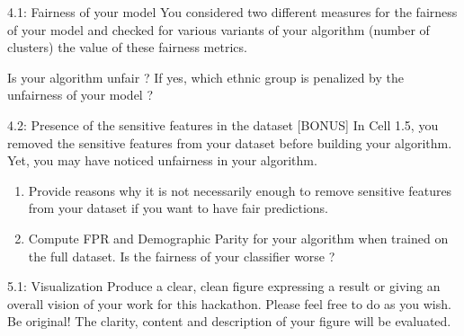 \documentclass [a4paper, 12pt] {article}
\begin{document}
\begin{question}{4.1: Fairness of your model}
You considered two different measures for the fairness of your model and checked for various variants of your algorithm (number of clusters) the value of these fairness metrics.

Is your algorithm unfair ? If yes, which ethnic group is penalized by the unfairness of your model ?
\end{question}
\begin{answer}\color{blue}
\end{answer}

\begin{question}{4.2: Presence of the sensitive features in the dataset [BONUS]}
In Cell 1.5, you removed the sensitive features from your dataset before building your algorithm. Yet, you may have noticed unfairness in your algorithm.
\begin{enumerate}
    \item Provide reasons why it is not necessarily enough to remove sensitive features from your dataset if you want to have fair predictions.
    \item Compute FPR and Demographic Parity for your algorithm when trained on the full dataset. Is the fairness of your classifier worse ?
\end{enumerate}
\end{question}
\begin{answer}\color{blue}
\end{answer}

\begin{question}{5.1: Visualization}
Produce a clear, clean figure expressing a result or giving an overall vision of your work for this hackathon. Please feel free to do as you wish. Be original! The clarity, content and description of your figure will be evaluated.
\end{question}
\begin{answer}\color{blue}
\end{answer}

\clearpage
\end{document}
